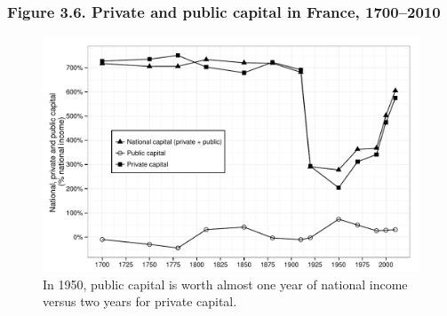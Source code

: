 \documentclass[t]{beamer}\usepackage[]{graphicx}\usepackage[]{color}
\newenvironment{knitrout}{}{} %
\begin{document}
\begin{frame}[label=Figure_3_6]
\frametitle{Figure 3.6. Private and public capital in France, 1700--2010}
\begin{figure}[t]
\begin{minipage}[b]{\textwidth}
\centering
\begin{knitrout}\footnotesize
{}\color{fgcolor}

{\centering \includegraphics[width=1\linewidth]{figures/bw/Figure_3_6} 

}



\end{knitrout}
\caption{In 1950, public capital is worth almost one year of national income versus two years for private capital.}
\end{minipage}
\end{figure}
\end{frame}
\end{document}
